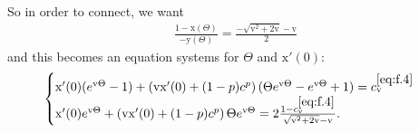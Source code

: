 \documentclass[12pt,a4paper]{amsart}
\numberwithin{equation}{section}
\theoremstyle{plain}
\theoremstyle{remark}
\begin{document}
So in order to connect, we want 
\begin{align}
\frac{1- \mathrm x(\Theta)}{- \mathrm y(\Theta)} =  \frac{-\sqrt{\mathrm v^2 + 2 \mathrm v}-\mathrm v}{2}
\end{align}
and this becomes an equation systems for $\Theta$ and $\mathrm x'(0)$:
\begin{align}
\begin{cases}
\mathrm x'(0)(e^{\mathrm v \Theta} - 1) + \left(\mathrm v \mathrm x'(0) + (1-p)c^p\right) (\Theta e^{\mathrm v \Theta} - e^{\mathrm v \Theta} + 1) = c_\mathrm v^{\eqref{eq:f.4}}\\
\mathrm x'(0) e^{\mathrm v \Theta} + \left(\mathrm v \mathrm x'(0) + (1-p)c^p\right) \Theta e^{\mathrm v\Theta} = 2\frac{1 - c_\mathrm v^{\eqref{eq:f.4}}}{\sqrt{\mathrm v^2 + 2\mathrm v} - \mathrm v}.
\end{cases}
\end{align}
	
\end{document}
